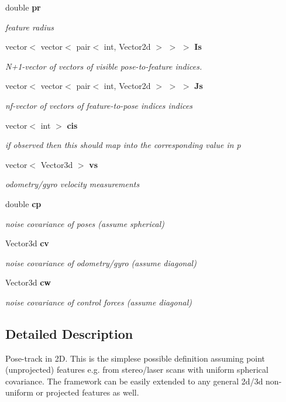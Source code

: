 \begin{DoxyCompactItemize}
double {\bf pr}
\begin{DoxyCompactList}\small\item\em feature radius \end{DoxyCompactList}\item 
vector$<$ vector$<$ pair$<$ int, \*
\-Vector2d $>$ $>$ $>$ {\bf \-Is}
\begin{DoxyCompactList}\small\item\em \-N+1-\/vector of vectors of visible pose-\/to-\/feature indices. \end{DoxyCompactList}\item 
vector$<$ vector$<$ pair$<$ int, \*
\-Vector2d $>$ $>$ $>$ {\bf \-Js}
\begin{DoxyCompactList}\small\item\em nf-\/vector of vectors of feature-\/to-\/pose indices indices \end{DoxyCompactList}\item 
vector$<$ int $>$ {\bf cis}
\begin{DoxyCompactList}\small\item\em if observed then this should map into the corresponding value in p \end{DoxyCompactList}\item 
vector$<$ \-Vector3d $>$ {\bf vs}
\begin{DoxyCompactList}\small\item\em odometry/gyro velocity measurements \end{DoxyCompactList}\item 
double {\bf cp}
\begin{DoxyCompactList}\small\item\em noise covariance of poses (assume spherical) \end{DoxyCompactList}\item 
\-Vector3d {\bf cv}
\begin{DoxyCompactList}\small\item\em noise covariance of odometry/gyro (assume diagonal) \end{DoxyCompactList}\item 
\-Vector3d {\bf cw}
\begin{DoxyCompactList}\small\item\em noise covariance of control forces (assume diagonal) \end{DoxyCompactList}\end{DoxyCompactItemize}


\subsection{\-Detailed \-Description}
\-Pose-\/track in 2\-D. \-This is the simplese possible definition assuming point (unprojected) features e.\-g. from stereo/laser scans with uniform spherical covariance. \-The framework can be easily extended to any general 2d/3d non-\/uniform or projected features as well. 

